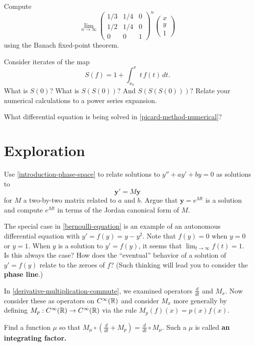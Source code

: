 \documentclass{homework}
\begin{document}
\begin{problem}
  Compute
  \[
    \lim_{n \to \infty} \begin{pmatrix} 1/3 & 1/4 & 0 \\ 1/2 & 1/4 & 0 \\ 0 & 0 & 1 \end{pmatrix}^n \begin{pmatrix} x \\ y \\ 1 \end{pmatrix}
  \]
  using the Banach fixed-point theorem.
\end{problem}

\begin{problem}\label{picard-method-numerical}Consider iterates of the map
  \[
    S(f) = 1 + \int_{x_0}^x t \, f(t) \, dt.
  \]
  What is $S(0)$?  What is $S(S(0))$?  And $S(S(S(0)))$?  Relate your numerical calculations to a power series expansion.
\end{problem}

\begin{problem}
  What differential equation is being solved in \ref{picard-method-numerical}?
\end{problem}

\section{Exploration}

\begin{problem}
  Use \ref{introduction-phase-space} to relate solutions to $y'' + ay' + by = 0$ as solutions to
  \[
    \mathbf{y}' = M\mathbf{y}
  \]
  for $M$ a two-by-two matrix related to $a$ and $b$.  Argue that $\mathbf{y} = e^{Mt}$ is a solution and compute $e^{Mt}$ in terms of the Jordan canonical form of $M$.
\end{problem}

\begin{problem}
  The special case in \ref{bernoulli-equation} is an example of an
  autonomous differential equation with $y' = f(y) = y - y^2$.  Note
  that $f(y) = 0$ when $y = 0$ or $y = 1$.  When $y$ is a solution to
  $y' = f(y)$, it seems that $\lim_{t \to \infty} f(t) = 1$.  Is this
  always the case?  How does the ``eventual'' behavior of a solution
  of $y' = f(y)$ relate to the zeroes of $f$?  (Such thinking will
  lead you to consider the \textbf{phase line}.)
\end{problem}

\begin{problem}\label{integrating-factor}In \ref{derivative-multiplication-commute}, we examined operators $\frac{d}{dt}$ and $M_x$.  Now consider these as operators on $C^\infty(\mathbb{R})$ and consider $M_x$ more generally by defining $M_p : C^\infty(\mathbb{R}) \to C^\infty(\mathbb{R})$ via the rule $M_p(f)(x) = p(x) f(x)$.

  Find a function $\mu$ so that \(
    M_\mu \circ (\displaystyle\frac{d}{dt} + M_p) = \displaystyle\frac{d}{dt} \circ M_\mu.
  \)
  Such a $\mu$ is called \textbf{an integrating factor.}
\end{problem}
\end{document}
